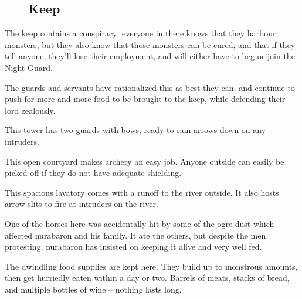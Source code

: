 \begin{figure}
	\subsection{ Keep}
\vspace{-2cm}

\label{redfall_keep_map}

\end{figure}

\setcounter{list}{0}

The keep contains a conspiracy: everyone in there knows that they harbour monsters, but they also know that those monsters can be cured, and that if they tell anyone, they'll lose their employment, and will either have to beg or join the Night Guard.

The guards and servants have rationalized this as best they can, and continue to push for more and more food to be brought to the keep, while defending their lord zealously.


This tower has two guards with bows, ready to rain arrows down on any intruders.


\humanarcher


This open courtyard makes archery an easy job.  Anyone outside can easily be picked off if they do not have adequate shielding.


This spacious lavatory comes with a runoff to the river outside.  It also hosts arrow slits to fire at intruders on the river.


One of the horses here was accidentally hit by some of the ogre-dust which affected \gls{nurabaron} and his family.  It ate the others, but despite the men protesting, \gls{nurabaron} has insisted on keeping it alive and very well fed.


\nurahorse


The dwindling food supplies are kept here.  They build up to monstrous amounts, then get hurriedly eaten within a day or two.  Barrels of meats, stacks of bread, and multiple bottles of wine -- nothing lasts long.

